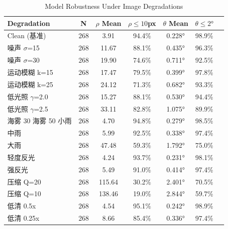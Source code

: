 \begin{table}[htbp]
\centering
\caption{Model Robustness Under Image Degradations}
\label{tab:degradation_robustness}
\begin{tabular}{lcccccc}
\toprule
Degradation & N & $\rho$ Mean & $\rho \leq 10$px & $\theta$ Mean & $\theta \leq 2°$ \\
\midrule
Clean (基准) & 268 & 3.91 & 94.4\% & 0.228° & 98.9\% \\
噪声 $\sigma$=15 & 268 & 11.67 & 88.1\% & 0.435° & 96.3\% \\
噪声 $\sigma$=30 & 268 & 19.90 & 74.6\% & 0.711° & 92.5\% \\
运动模糊 k=15 & 268 & 17.47 & 79.5\% & 0.399° & 97.8\% \\
运动模糊 k=25 & 268 & 24.12 & 71.3\% & 0.682° & 93.3\% \\
低光照 $\gamma$=2.0 & 268 & 15.27 & 88.1\% & 0.530° & 94.4\% \\
低光照 $\gamma$=2.5 & 268 & 33.11 & 82.8\% & 1.075° & 89.9\% \\
海雾 30%
海雾 50%
小雨 & 268 & 4.70 & 94.8\% & 0.279° & 98.5\% \\
中雨 & 268 & 5.99 & 92.5\% & 0.338° & 97.4\% \\
大雨 & 268 & 47.48 & 59.3\% & 1.792° & 75.0\% \\
轻度反光 & 268 & 4.24 & 93.7\% & 0.231° & 98.1\% \\
强反光 & 268 & 5.49 & 91.0\% & 0.414° & 97.4\% \\
压缩 Q=20 & 268 & 115.64 & 30.2\% & 2.401° & 70.5\% \\
压缩 Q=10 & 268 & 138.46 & 19.0\% & 2.844° & 59.7\% \\
低清 0.5x & 268 & 4.54 & 95.1\% & 0.242° & 98.9\% \\
低清 0.25x & 268 & 8.66 & 85.4\% & 0.336° & 97.4\% \\
\bottomrule
\end{tabular}
\end{table}